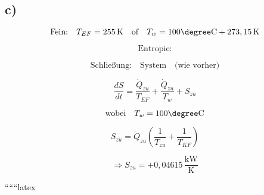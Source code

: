

\subsection*{c)}
\[
\text{Fein:} \quad T_{EF} = 255 \, \text{K} \quad \text{of} \quad T_w = 100 \degree \text{C} + 273,15 \, \text{K}
\]

\[
\text{Entropie:}
\]

\[
\text{Schließung:} \quad \text{System} \quad \text{(wie vorher)}
\]

\[
\frac{dS}{dt} = \frac{\dot{Q}_{zu}}{T_{EF}} + \frac{\dot{Q}_{zu}}{T_w} + S_{zu}
\]

\[
\text{wobei} \quad T_w = 100 \degree \text{C}
\]

\[
S_{zu} = \dot{Q}_{zu} \left( \frac{1}{T_{zu}} + \frac{1}{T_{KF}} \right)
\]

\[
\Rightarrow S_{zu} = +0,04615 \, \frac{\text{kW}}{\text{K}}
\]

``````latex